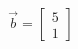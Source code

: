 \documentclass[preview]{standalone}
\begin{document}
\begin{align*}
\vec{b} = \begin{bmatrix} 5 \\ 1 \end{bmatrix}
\end{align*}
\end{document}
